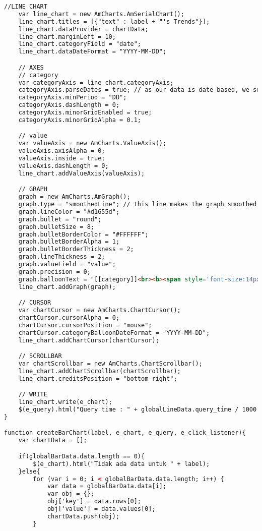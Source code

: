 \begin{lstlisting}[language=HTML,basicstyle=\tiny,caption=script-dashboard.js]
    //LINE CHART
    var line_chart = new AmCharts.AmSerialChart();
    line_chart.titles = [{"text" : label + "'s Trends"}];
    line_chart.dataProvider = chartData;
    line_chart.marginLeft = 10;
    line_chart.categoryField = "date";
    line_chart.dataDateFormat = "YYYY-MM-DD";

    // AXES
    // category
    var categoryAxis = line_chart.categoryAxis;
    categoryAxis.parseDates = true; // as our data is date-based, we set parseDates to true
    categoryAxis.minPeriod = "DD";
    categoryAxis.dashLength = 0;
    categoryAxis.minorGridEnabled = true;
    categoryAxis.minorGridAlpha = 0.1;

    // value
    var valueAxis = new AmCharts.ValueAxis();
    valueAxis.axisAlpha = 0;
    valueAxis.inside = true;
    valueAxis.dashLength = 0;
    line_chart.addValueAxis(valueAxis);

    // GRAPH
    graph = new AmCharts.AmGraph();
    graph.type = "smoothedLine"; // this line makes the graph smoothed line.
    graph.lineColor = "#d1655d";
    graph.bullet = "round";
    graph.bulletSize = 8;
    graph.bulletBorderColor = "#FFFFFF";
    graph.bulletBorderAlpha = 1;
    graph.bulletBorderThickness = 2;
    graph.lineThickness = 2;
    graph.valueField = "value";
    graph.precision = 0;
    graph.balloonText = "[[category]]<br><b><span style='font-size:14px;'>[[value]]</span></b>";
    line_chart.addGraph(graph);

    // CURSOR
    var chartCursor = new AmCharts.ChartCursor();
    chartCursor.cursorAlpha = 0;
    chartCursor.cursorPosition = "mouse";
    chartCursor.categoryBalloonDateFormat = "YYYY-MM-DD";
    line_chart.addChartCursor(chartCursor);

    // SCROLLBAR
    var chartScrollbar = new AmCharts.ChartScrollbar();
    line_chart.addChartScrollbar(chartScrollbar);
    line_chart.creditsPosition = "bottom-right";

    // WRITE
    line_chart.write(e_chart);
    $(e_query).html("Query time : " + globalLineData.query_time / 1000 + "s");
}

function createBarChart(label, e_chart, e_query, e_click_listener){
    var chartData = [];

    if(globalBarData.data.length == 0){
        $(e_chart).html("Tidak ada data untuk " + label);
    }else{
        for (var i = 0; i < globalBarData.data.length; i++) {
            var data = globalBarData.data[i];
            var obj = {};
            obj['key'] = data.rows[0];
            obj['value'] = data.values[0];
            chartData.push(obj);
        }


\end{lstlisting}
